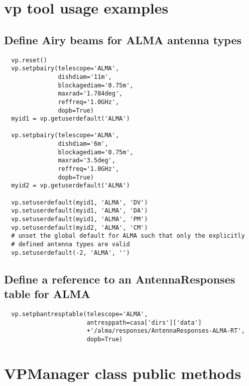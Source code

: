 \documentclass[12pt]{article}
\begin{document}
\newpage
\appendix

\section{vp tool usage examples}
\label{appex}

\subsection{Define Airy beams for ALMA antenna types}
\begin{verbatim}
  vp.reset()
  vp.setpbairy(telescope='ALMA',
               dishdiam='11m',
               blockagediam='0.75m',
               maxrad='1.784deg',
               reffreq='1.0GHz',
               dopb=True)
  myid1 = vp.getuserdefault('ALMA')
  
  vp.setpbairy(telescope='ALMA',
               dishdiam='6m',
               blockagediam='0.75m',
               maxrad='3.5deg',
               reffreq='1.0GHz',
               dopb=True)
  myid2 = vp.getuserdefault('ALMA')

  vp.setuserdefault(myid1, 'ALMA', 'DV')
  vp.setuserdefault(myid1, 'ALMA', 'DA')
  vp.setuserdefault(myid1, 'ALMA', 'PM')
  vp.setuserdefault(myid2, 'ALMA', 'CM')
  # unset the global default for ALMA such that only the explicitly
  # defined antenna types are valid
  vp.setuserdefault(-2, 'ALMA', '')
 \end{verbatim}

\subsection{Define a reference to an AntennaResponses table for ALMA}
\begin{verbatim}
  vp.setpbantresptable(telescope='ALMA',
                       antresppath=casa['dirs']['data']
                       +'/alma/responses/AntennaResponses-ALMA-RT',
                       dopb=True)
\end{verbatim}

\newpage

\section{VPManager class public methods}
\label{appVPMan}
\end{document}

